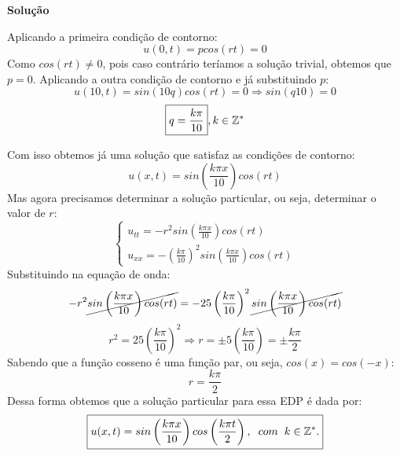 \linespread{1.5}

\textbf{Solução}

Aplicando a primeira condição de contorno:
\begin{equation*}
    u(0,t) = pcos(rt) = 0
\end{equation*}
Como $cos(rt) \neq 0$, pois caso contrário teríamos a solução trivial, obtemos que $\boxed{p=0}$. Aplicando a outra condição de contorno e já substituindo $p$:
\begin{equation*}
    u(10,t) = sin(10q)cos(rt) = 0 \Rightarrow sin(q10) = 0
\end{equation*}
\begin{equation*}
    \boxed{q = \frac{k\pi}{10}}, k\in\mathbb{Z}^*
\end{equation*}

Com isso obtemos já uma solução que satisfaz as condições de contorno:
\begin{equation*}
    u(x,t) = sin\left(\frac{k\pi x}{10}\right)cos(rt)
\end{equation*}
Mas agora precisamos determinar a solução particular, ou seja, determinar o valor de $r$:
\begin{equation*}
    \begin{cases}
        u_{tt} = -r^2sin\left(\frac{k\pi x}{10}\right)cos(rt)\\
        u_{xx} = -\left(\frac{k\pi}{10}\right)^2sin\left(\frac{k\pi x}{10}\right)cos(rt)
    \end{cases}
\end{equation*}
Substituindo na equação de onda:
\begin{equation*}
    -r^2\cancel{sin\left(\frac{k\pi x}{10}\right)cos(rt)} = -25\left(\frac{k\pi}{10}\right)^2\cancel{sin\left(\frac{k\pi x}{10}\right)cos(rt)}
\end{equation*}
\begin{equation*}
    r^2 = 25\left(\frac{k\pi}{10}\right)^2 \Rightarrow r = \pm 5\left(\frac{k\pi}{10}\right) = \pm \frac{k\pi}{2}
\end{equation*}
Sabendo que a função cosseno é uma função par, ou seja, $cos(x) = cos(-x)$:
\begin{equation*}
    \boxed{r = \frac{k\pi}{2}}
\end{equation*}
Dessa forma obtemos que a solução particular para essa EDP é dada por:
\begin{equation*}
    \boxed{u(x,t) = sin\left(\frac{k\pi x}{10}\right)cos\left(\frac{k\pi t}{2}\right),\hspace{0,2cm}com\hspace{0,2cm}k\in\Z^*.}
\end{equation*}
